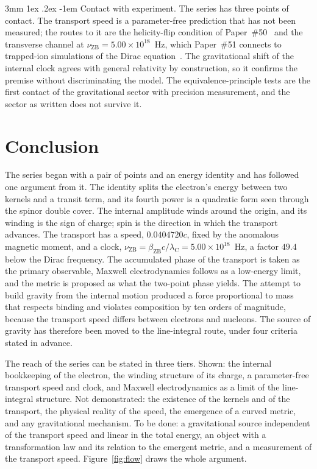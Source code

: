 \documentclass[%
 reprint, amsmath,amssymb, aps, prb, ]{revtex4-2}
\makeatletter
\numberwithin{equation}{section}
\renewcommand\paragraph{%
  \@startsection{paragraph}{4}{\z@}%
    {3mm \@plus 1ex \@minus .2ex}%
    {-1em}%
    {\normalfont\normalsize\itshape}}
\newcommand{\betaZB}{\beta_{\text{ZB}}}
\newcommand{\lambdaC}{\lambda_{\text{C}}}
\newcommand{\nuZB}{\nu_{\text{ZB}}}
\makeatother
\begin{document}
\paragraph{Contact with experiment.} The series has three points of contact. The transport speed is a parameter-free prediction that has not been measured; the routes to it are the helicity-flip condition of Paper~\#50~\cite{hanamura50} and the transverse channel at $\nuZB = 5.00\times10^{18}$~Hz, which Paper~\#51 connects to trapped-ion simulations of the Dirac equation~\cite{hanamura51}. The gravitational shift of the internal clock agrees with general relativity by construction, so it confirms the premise without discriminating the model. The equivalence-principle tests are the first contact of the gravitational sector with precision measurement, and the sector as written does not survive it.

\section{Conclusion}
\label{sec:conclusion}

The series began with a pair of points and an energy identity and has followed one argument from it. The identity splits the electron's energy between two kernels and a transit term, and its fourth power is a quadratic form seen through the spinor double cover. The internal amplitude winds around the origin, and its winding is the sign of charge; spin is the direction in which the transport advances. The transport has a speed, $0.0404720c$, fixed by the anomalous magnetic moment, and a clock, $\nuZB = \betaZB c/\lambdaC = 5.00\times10^{18}$~Hz, a factor $49.4$ below the Dirac frequency. The accumulated phase of the transport is taken as the primary observable, Maxwell electrodynamics follows as a low-energy limit, and the metric is proposed as what the two-point phase yields. The attempt to build gravity from the internal motion produced a force proportional to mass that respects binding and violates composition by ten orders of magnitude, because the transport speed differs between electrons and nucleons. The source of gravity has therefore been moved to the line-integral route, under four criteria stated in advance.

The reach of the series can be stated in three tiers. Shown: the internal bookkeeping of the electron, the winding structure of its charge, a parameter-free transport speed and clock, and Maxwell electrodynamics as a limit of the line-integral structure. Not demonstrated: the existence of the kernels and of the transport, the physical reality of the speed, the emergence of a curved metric, and any gravitational mechanism. To be done: a gravitational source independent of the transport speed and linear in the total energy, an object with a transformation law and its relation to the emergent metric, and a measurement of the transport speed. Figure~\ref{fig:flow} draws the whole argument.
\end{document}
